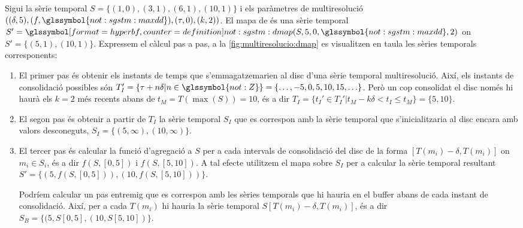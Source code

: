 \begin{example}
  Sigui la sèrie temporal $S=\{(1,0),(3,1),(6,1),(10,1)\}$ i els
  paràmetres de multiresolució
  $((\delta,5),(f,\glssymbol{not:sgstm:maxdd}),(\tau,0),(k,2))$.  El
  mapa de  és una sèrie temporal $S'=
  \glssymboldef{not:sgstm:dmap}(S,5,0,\glssymbol{not:sgstm:maxdd},2)$
  on $S'=\{(5,1),(10,1)\}$. Expressem el càlcul pas a pas, a la
  \autoref{fig:multiresolucio:dmap} es visualitzen en taula les sèries
  temporals corresponents:
  \begin{enumerate}
  \item El primer pas és obtenir els instants de temps que
    s'emmagatzemarien al disc d'una sèrie temporal
    multiresolució. Així, els instants de consolidació possibles són
    $T_I'=\{\tau+n\delta|n\in\glssymbol{not:Z}\}=
    \{\ldots,-5,0,5,10,15,\ldots\}$. Però un cop consolidat el disc
    només hi haurà els $k=2$ més recents abans de $t_M=T(\max(S))=10$,
    és a dir $T_I=\{t_I'\in T_I'|t_M - k\delta < t_I \leq
    t_M\}=\{5,10\}$.

  \item El segon pas és obtenir a partir de $T_I$ la sèrie temporal
    $S_I$ que es correspon amb la sèrie temporal que s'inicialitzaria
    al disc encara amb valors desconeguts,
    $S_I=\{(5,\infty),(10,\infty)\}$.



  \item El tercer pas és calcular la funció d'agregació a $S$ per a
    cada intervals de consolidació del disc de la forma
    $[T(m_i)-\delta,T(m_i)]$ on $m_i\in S_i$, és a dir $f(S,[0,5])$ i
    $f(S,[5,10])$. A tal efecte utilitzem el mapa sobre $S_I$ per a
    calcular la sèrie temporal resultant $S'=\{ (5,f(S,[0,5])),
    (10,f(S,[5,10])) \}$.

    Podríem calcular un pas entremig que es correspon amb les sèries
    temporals que hi hauria en el buffer abans de cada instant de
    consolidació. Així, per a cada $T(m_i)$ hi hauria la sèrie
    temporal $S[T(m_i)-\delta,T(m_i)]$, és a dir $S_B=\{
    (5,S[0,5],(10,S[5,10]) \}$.


  \end{enumerate}


  



\end{example}
